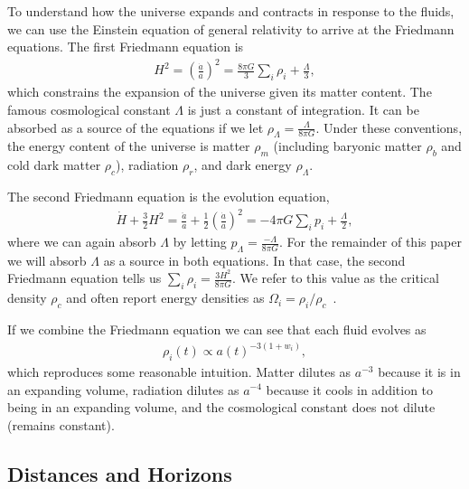 \documentclass[12pt]{article}
\begin{document}
To understand how the universe expands and contracts in response to the fluids, we can use the Einstein equation of general relativity to arrive at the Friedmann equations. The first Friedmann equation is 
\begin{align}
H^2 = \left(\frac{\dot{a}}{a}\right)^2 = \frac{8\pi G}{3} \sum_i \rho_i  + \frac{\Lambda}{3}, \label{eqn:fri1}
\end{align}
which constrains the expansion of the universe given its matter content. The famous cosmological constant $\Lambda$ is just a constant of integration. It can be absorbed as a source of the equations if we let $\rho_\Lambda=\frac{\Lambda}{8\pi G}$. Under these conventions, the energy content of the universe is matter $\rho_m$ (including baryonic matter $\rho_b$ and cold dark matter $\rho_c$), radiation $\rho_r$, and dark energy $\rho_\Lambda$.

The second Friedmann equation is the evolution equation,
\begin{align}
\dot{H} + \frac{3}{2}H^2 = \frac{\ddot{a}}{a} + \frac{1}{2} \left(\frac{\dot{a}}{a}\right)^2 = -4\pi G\sum_i p_i  + \frac{\Lambda}{2}, \label{eqn:fri2}
\end{align}
where we can again absorb $\Lambda$ by letting $p_\Lambda = \frac{-\Lambda}{8\pi G}$. For the remainder of this paper we will absorb $\Lambda$ as a source in both equations. 
In that case, the second Friedmann equation tells us $\sum_i\rho_i = \frac{3H^2}{8\pi G}$. We refer to this value as the critical density $\rho_c$ and often report energy densities as $\Omega_i = \rho_i/\rho_c$~\cite{Planck2013}.

If we combine the Friedmann equation we can see that each fluid evolves as 
\begin{align}
\rho_i(t) \propto a(t)^{-3(1+w_i)}, \label{eqn:pevolve}
\end{align}
which reproduces some reasonable intuition. Matter dilutes as $a^{-3}$ because it is in an expanding volume, radiation dilutes as $a^{-4}$ because it cools in addition to being in an expanding volume, and the cosmological constant does not dilute (remains constant).

\subsection{Distances and Horizons}
\end{document}
